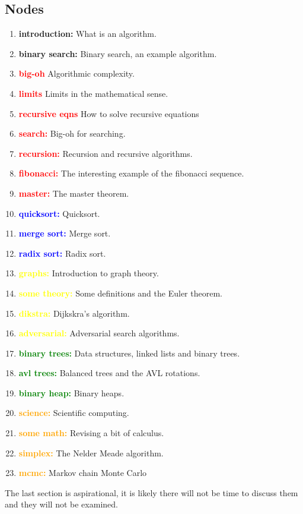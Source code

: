 \documentclass[11pt,a4paper]{scrartcl}
\begin{document}
\subsection*{Nodes}

\begin{enumerate}[label=(\alph*)]
\item \textbf{introduction:} What is an algorithm.
\item \textbf{binary search:} Binary search, an example algorithm.
\item \textbf{\textcolor{red}{big-oh}} Algorithmic complexity.
\item \textbf{\textcolor{red}{limits}} Limits in the mathematical sense.
\item \textbf{\textcolor{red}{recursive eqns}} How to solve recursive equations
\item \textbf{\textcolor{red}{search:}} Big-oh for searching.
\item \textbf{\textcolor{red}{recursion:}} Recursion and recursive algorithms.
\item \textbf{\textcolor{red}{fibonacci:}} The interesting example of the fibonacci sequence. 
\item \textbf{\textcolor{red}{master:}} The master theorem.
\item \textbf{\textcolor{blue}{quicksort:}} Quicksort.
\item \textbf{\textcolor{blue}{merge sort:}} Merge sort.
\item \textbf{\textcolor{blue}{radix sort:}} Radix sort.
\item \textbf{\textcolor{yellow}{graphs:}} Introduction to graph theory.
\item \textbf{\textcolor{yellow}{some theory:}} Some definitions and the Euler theorem. 
\item \textbf{\textcolor{yellow}{dikstra:}} Dijkskra's algorithm.
\item \textbf{\textcolor{yellow}{adversarial:}} Adversarial search algorithms.
\item \textbf{\textcolor{green}{binary trees:}} Data structures, linked lists and binary trees.
\item \textbf{\textcolor{green}{avl trees:}} Balanced trees and the AVL rotations. 
\item \textbf{\textcolor{green}{binary heap:}} Binary heaps. 
\item \textbf{\textcolor{orange}{science:}} Scientific computing.
\item \textbf{\textcolor{orange}{some math:}} Revising a bit of calculus.
\item \textbf{\textcolor{orange}{simplex:}} The Nelder Meade algorithm.
\item \textbf{\textcolor{orange}{mcmc:}} Markov chain Monte Carlo

\end{enumerate}

The last section is aspirational, it is likely there will not be time to discuss them and they will not be examined.
\end{document}
